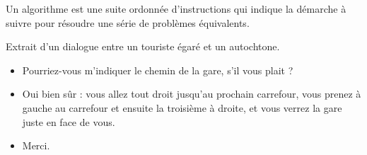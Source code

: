 \begin{defin}
Un algorithme est une suite ordonnée d'instructions qui indique la démarche 
à suivre pour résoudre une série de problèmes équivalents.
\end{defin}

\begin{ex}\label{ex:chemin}
Extrait d'un dialogue entre un touriste égaré et un autochtone.
\begin{itemize}
\item Pourriez-vous m'indiquer le chemin de la gare, s'il vous plait ?
\item Oui bien sûr : vous allez tout droit jusqu'au prochain carrefour,
	vous prenez à gauche au carrefour et ensuite la troisième à droite,
	et vous verrez la gare juste en face de vous.
\item Merci.
\end{itemize}
\end{ex}

